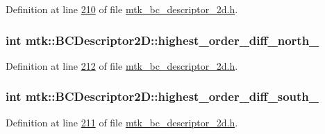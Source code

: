 Definition at line \hyperlink{mtk__bc__descriptor__2d_8h_source_l00210}{210} of file \hyperlink{mtk__bc__descriptor__2d_8h_source}{mtk\+\_\+bc\+\_\+descriptor\+\_\+2d.\+h}.

\hypertarget{classmtk_1_1BCDescriptor2D_a6cdeefe70f5bef93196f34ab2949cad2}{
\subsubsection[{highest\+\_\+order\+\_\+diff\+\_\+north\+\_\+}]{\setlength{\rightskip}{0pt plus 5cm}int mtk\+::\+B\+C\+Descriptor2\+D\+::highest\+\_\+order\+\_\+diff\+\_\+north\+\_\+\hspace{0.3cm}{\ttfamily [private]}}}\label{classmtk_1_1BCDescriptor2D_a6cdeefe70f5bef93196f34ab2949cad2}


Definition at line \hyperlink{mtk__bc__descriptor__2d_8h_source_l00212}{212} of file \hyperlink{mtk__bc__descriptor__2d_8h_source}{mtk\+\_\+bc\+\_\+descriptor\+\_\+2d.\+h}.

\hypertarget{classmtk_1_1BCDescriptor2D_a1fb094e5e53ecfba32fe9fe56c051c47}{
\subsubsection[{highest\+\_\+order\+\_\+diff\+\_\+south\+\_\+}]{\setlength{\rightskip}{0pt plus 5cm}int mtk\+::\+B\+C\+Descriptor2\+D\+::highest\+\_\+order\+\_\+diff\+\_\+south\+\_\+\hspace{0.3cm}{\ttfamily [private]}}}\label{classmtk_1_1BCDescriptor2D_a1fb094e5e53ecfba32fe9fe56c051c47}


Definition at line \hyperlink{mtk__bc__descriptor__2d_8h_source_l00211}{211} of file \hyperlink{mtk__bc__descriptor__2d_8h_source}{mtk\+\_\+bc\+\_\+descriptor\+\_\+2d.\+h}.


